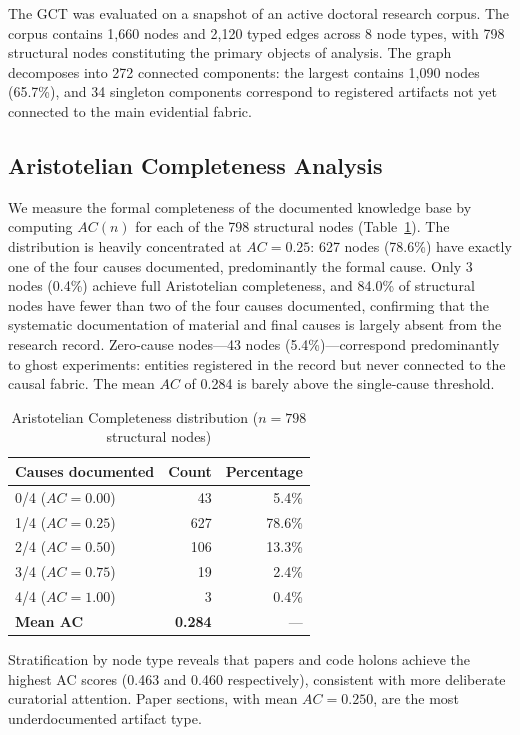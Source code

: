 \documentclass{iosart2x}
\begin{document}
The GCT was evaluated on a snapshot of an active doctoral research corpus. The corpus contains 1,660 nodes and 2,120 typed edges across 8 node types, with 798 structural nodes constituting the primary objects of analysis. The graph decomposes into 272 connected components: the largest contains 1,090 nodes (65.7\%), and 34 singleton components correspond to registered artifacts not yet connected to the main evidential fabric.

\subsection{Aristotelian Completeness Analysis}

We measure the formal completeness of the documented knowledge base by computing $\mathit{AC}(n)$ for each of the 798 structural nodes (Table~\ref{tab:ac}). The distribution is heavily concentrated at $\mathit{AC} = 0.25$: 627 nodes (78.6\%) have exactly one of the four causes documented, predominantly the formal cause. Only 3 nodes (0.4\%) achieve full Aristotelian completeness, and 84.0\% of structural nodes have fewer than two of the four causes documented, confirming that the systematic documentation of material and final causes is largely absent from the research record. Zero-cause nodes---43 nodes (5.4\%)---correspond predominantly to ghost experiments: entities registered in the record but never connected to the causal fabric. The mean $\mathit{AC}$ of 0.284 is barely above the single-cause threshold.

\begin{table}[htb]
\caption{Aristotelian Completeness distribution ($n = 798$ structural nodes)}
\label{tab:ac}
\centering
\begin{tabular}{lrr}
\toprule
Causes documented & Count & Percentage \\
\midrule
0/4 ($\mathit{AC} = 0.00$) &  43 &  5.4\% \\
1/4 ($\mathit{AC} = 0.25$) & 627 & 78.6\% \\
2/4 ($\mathit{AC} = 0.50$) & 106 & 13.3\% \\
3/4 ($\mathit{AC} = 0.75$) &  19 &  2.4\% \\
4/4 ($\mathit{AC} = 1.00$) &   3 &  0.4\% \\
\midrule
\textbf{Mean AC} & \textbf{0.284} & --- \\
\bottomrule
\end{tabular}
\end{table}

Stratification by node type reveals that papers and code holons achieve the highest AC scores (0.463 and 0.460 respectively), consistent with more deliberate curatorial attention. Paper sections, with mean $\mathit{AC} = 0.250$, are the most underdocumented artifact type.
\end{document}
